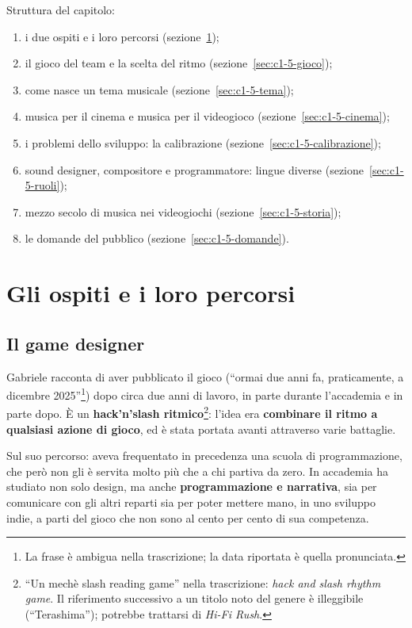 Struttura del capitolo:
\begin{enumerate}
  \item i due ospiti e i loro percorsi (sezione~\ref{sec:c1-5-ospiti});
  \item il gioco del team e la scelta del ritmo (sezione~\ref{sec:c1-5-gioco});
  \item come nasce un tema musicale (sezione~\ref{sec:c1-5-tema});
  \item musica per il cinema e musica per il videogioco
        (sezione~\ref{sec:c1-5-cinema});
  \item i problemi dello sviluppo: la calibrazione
        (sezione~\ref{sec:c1-5-calibrazione});
  \item sound designer, compositore e programmatore: lingue diverse
        (sezione~\ref{sec:c1-5-ruoli});
  \item mezzo secolo di musica nei videogiochi (sezione~\ref{sec:c1-5-storia});
  \item le domande del pubblico (sezione~\ref{sec:c1-5-domande}).
\end{enumerate}

\section{Gli ospiti e i loro percorsi}
\label{sec:c1-5-ospiti}

\subsection{Il game designer}

Gabriele racconta di aver pubblicato il gioco (``ormai due anni fa,
praticamente, a dicembre 2025''\footnote{La frase è ambigua nella trascrizione;
la data riportata è quella pronunciata.}) dopo circa due anni di lavoro, in parte
durante l'accademia e in parte dopo. È un \textbf{hack'n'slash ritmico}\footnote{
``Un mechè slash reading game'' nella trascrizione: \emph{hack and slash rhythm
game}. Il riferimento successivo a un titolo noto del genere è illeggibile
(``Terashima''); potrebbe trattarsi di \emph{Hi-Fi Rush}.}: l'idea era
\textbf{combinare il ritmo a qualsiasi azione di gioco}, ed è stata portata avanti
attraverso varie battaglie.

Sul suo percorso: aveva frequentato in precedenza una scuola di programmazione,
che però non gli è servita molto più che a chi partiva da zero. In accademia ha
studiato non solo design, ma anche \textbf{programmazione e narrativa}, sia per
comunicare con gli altri reparti sia per poter mettere mano, in uno sviluppo
indie, a parti del gioco che non sono al cento per cento di sua competenza.

